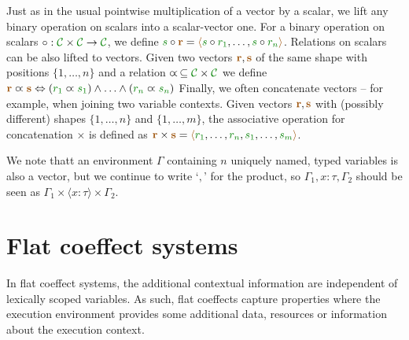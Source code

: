 Just as in the usual pointwise multiplication of a vector by a scalar, we lift any binary operation on scalars into a 
scalar-vector one. For a binary operation on scalars $\circ : \C \times \C \rightarrow \C$, we define
 $\cclrd{s} \circ \aclrd{\textbf{r}} = \alift{ \cclrd{s}\circ\cclrd{r_1}, \ldots, \cclrd{s}\circ\cclrd{r_n}}$.
Relations on scalars can be also lifted to vectors. Given two vectors $\aclrd{\textbf{r}}, \aclrd{\textbf{s}}$ of the
same shape with positions $\{ 1, \ldots, n \}$ and a relation $\varpropto\, \subseteq \C \times \C$ we define 
$\aclrd{\textbf{r}} \varpropto \aclrd{\textbf{s}} \Leftrightarrow (\cclrd{r_1} \varpropto \cclrd{s_1}) \wedge \ldots \wedge (\cclrd{r_n} \varpropto \cclrd{s_n}) $
Finally, we often concatenate vectors -- for example, when joining two variable contexts.
Given vectors $\aclrd{\textbf{r}}, \aclrd{\textbf{s}}$ with (possibly different) shapes $\{ 1, \ldots, n \}$ and 
$\{ 1, \ldots, m \}$, the associative operation for concatenation $\times$ is defined as 
$\aclrd{\textbf{r}}\times\aclrd{\textbf{s}} = \alift{\cclrd{r_1},\ldots,\cclrd{r_n},\cclrd{s_1},\ldots,\cclrd{s_m}}$.

We note thatt an environment $\Gamma$ containing $n$ uniquely named, typed variables is also a vector, 
but we continue to write `$,$' for the product, so $\Gamma_1, x\!:\!\tau, \Gamma_2$ should 
be seen as $\Gamma_1 \times \langle x\!:\!\tau\rangle \times \Gamma_2$.




%	                            
%	                            

\section{Flat coeffect systems}
\label{sec:applications-flat}

In flat coeffect systems, the additional contextual information are independent of lexically scoped
variables. As such, flat coeffects capture properties where the execution environment provides some 
additional data, resources or information about the execution context.

